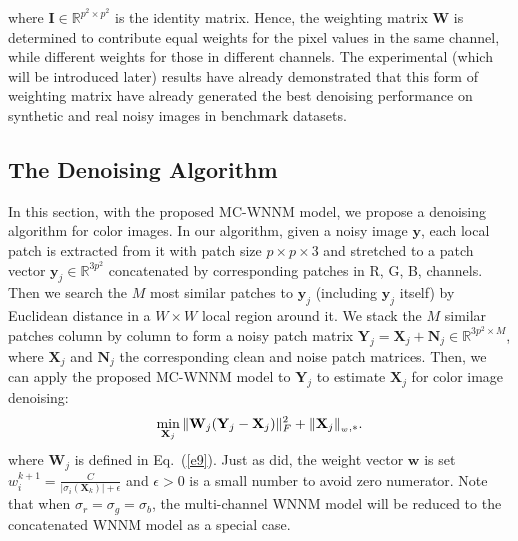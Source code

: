 \documentclass[10pt,twocolumn,letterpaper,sort&compress]{article}
\begin{document}
where $\mathbf{I}
\in\mathbb{R}^{p^{2}\times p^{2}}$ is the identity matrix. Hence, the weighting matrix $\mathbf{W}$ is determined to contribute equal weights for the pixel values in the same channel, while different weights for those in different channels. The experimental (which will be introduced later) results have already demonstrated that this form of weighting matrix have already generated the best denoising performance on synthetic and real noisy images in  benchmark datasets.




\subsection{The Denoising Algorithm}
In this section, with the proposed MC-WNNM model, we propose a denoising algorithm for color images. In our algorithm, given a noisy image $\mathbf{y}$, each local patch is extracted from it with patch size $p\times p \times 3$ and stretched to a patch vector $\mathbf{y}_{j}\in \mathbb{R}^{3p^{2}}$ concatenated by corresponding patches in R, G, B, channels. Then we search the $M$ most similar patches to $\mathbf{y}_{j}$ (including $\mathbf{y}_{j}$ itself) by Euclidean distance in a $W\times W$ local region around it. We stack the $M$ similar patches column by column to form a noisy patch matrix $\mathbf{Y}_{j}=\mathbf{X}_{j}+\mathbf{N}_{j}\in\mathbb{R}^{3p^{2}\times M}$, where $\mathbf{X}_{j}$ and $\mathbf{N}_{j}$ the corresponding clean and noise patch matrices. Then, we can apply the proposed MC-WNNM model to $\mathbf{Y}_{j}$ to estimate $\mathbf{X}_{j}$ for color image denoising:
\vspace{-2mm}
\begin{equation}
\label{e10}
\vspace{-2mm}
\min_{\mathbf{X}_{j}}
\|
\mathbf{W}_{j}
(\mathbf{Y}_{j}
-
\mathbf{X}_{j})
\|_{F}^{2}
+
\|
\mathbf{X}_{j}\|_{\bm_{w},*}.
\end{equation}
where $\mathbf{W}_{j}$ is defined in Eq.\ (\ref{e9}). Just as \cite{wnnmijcv} did, the weight vector $\bm{w}$ is set $w_{i}^{k+1}=\frac{C}{|\sigma_{i}(\mathbf{X}_{k})|+\epsilon }$ and $\epsilon>0$ is a small number to avoid zero numerator. Note that when $\sigma_{r}=\sigma_{g}=\sigma_{b}$, the multi-channel WNNM model will be reduced to the concatenated WNNM model as a special case.
\end{document}
